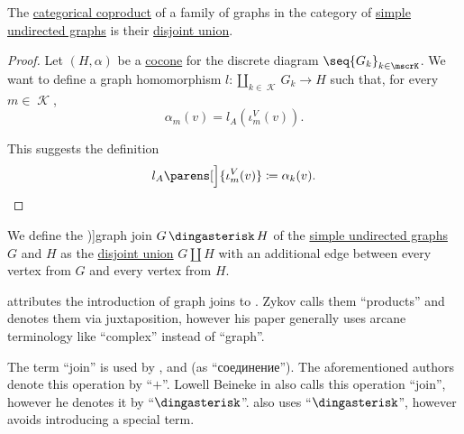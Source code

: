 \begin{proposition}\label{thm:undirected_graph_coproduct}
  The \hyperref[def:discrete_category_limits]{categorical coproduct} of a family of graphs in the category of \hyperref[def:undirected_graph]{simple undirected graphs} is their \hyperref[def:graph_disjoint_union]{disjoint union}.
\end{proposition}
\begin{proof}
  Let \( (H, \alpha) \) be a \hyperref[def:category_of_cones/cocone]{cocone} for the discrete diagram \( \seq{ G_k }_{k \in \mscrK} \). We want to define a graph homomorphism \( l: \coprod_{k \in \mscrK} G_k \to H \) such that, for every \( m \in \mscrK \),
  \begin{equation*}
    \alpha_m(v) = l_A(\iota^V_m(v)).
  \end{equation*}

  This suggests the definition
  \begin{equation*}
    l_A\parens[\Big]{ \iota^V_m(v) } \coloneqq \alpha_k(v).
  \end{equation*}
\end{proof}

\begin{definition}\label{def:graph_join}
  We define the \term[ru=соединение (графов) (\cite[265]{Новиков2013ДискретнаяМатематика})]{graph join} \( G \Ast H \) of the \hyperref[def:undirected_graph]{simple undirected graphs} \( G \) and \( H \) as the \hyperref[def:graph_disjoint_union]{disjoint union} \( G \coprod H \) with an additional edge between every vertex from \( G \) and every vertex from \( H \).
\end{definition}
\begin{comments}
  \item {} attributes the introduction of graph joins to \cite[164]{Зыков1949СоединенияГрафов}. Zykov calls them \enquote{products} and denotes them via juxtaposition, however his paper generally uses arcane terminology like \enquote{complex} instead of \enquote{graph}.

  The term \enquote{join} is used by ,  and  (as \enquote{соединение}). The aforementioned authors denote this operation by \enquote{\( + \)}. Lowell Beineke in \cite[547]{Rosen1999DiscreteHandbook} also calls this operation \enquote{join}, however he denotes it by \enquote{\( \Ast \)}.  also uses \enquote{\( \Ast \)}, however avoids introducing a special term.
\end{comments}

